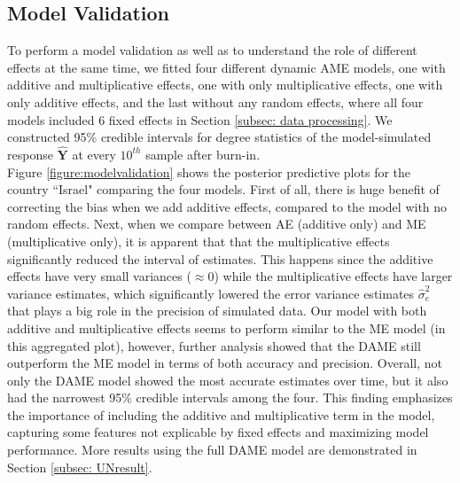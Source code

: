 \documentclass[a4paper]{article}
\begin{document}
\subsection{Model Validation}\label{subsec: Model Validation}
To perform a model validation as well as to understand the role of different effects at the same time, we fitted four different dynamic AME models, one with additive and multiplicative effects, one with only multiplicative effects, one with only additive effects, and the last without any random effects, where all four models included 6 fixed effects in Section \ref{subsec: data processing}. We constructed 95\% credible intervals for degree statistics of the model-simulated response $\hat{\mathbf{Y}}$ at every $10^{th}$ sample after burn-in. \\ \newline
Figure \ref{figure:modelvalidation} shows the posterior predictive plots for the country ``Israel" comparing the four models. First of all, there is huge benefit of correcting the bias when we add additive effects, compared to the model with no random effects. Next, when we compare between AE (additive only) and ME (multiplicative only), it is apparent that that the multiplicative effects significantly reduced the interval of estimates. This happens since the additive effects have very small variances ($\approx0$) while the multiplicative effects have larger variance estimates, which significantly lowered the error variance estimates $\hat\sigma_e^2$ that plays a big role in the precision of simulated data. Our model with both additive and multiplicative effects seems to perform similar to the ME model (in this aggregated plot), however, further analysis showed that the DAME still outperform the ME model in terms of both accuracy and precision. Overall, not only the DAME model showed the most accurate estimates over time, but it also had the narrowest 95\% credible intervals among the four. This finding emphasizes the importance of including the additive and multiplicative term in the model, capturing some features not explicable by fixed effects and maximizing model performance. More results using the full DAME model are demonstrated in Section \ref{subsec: UNresult}.
\end{document}
